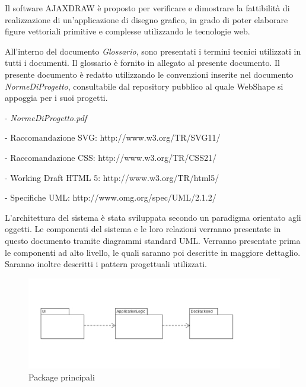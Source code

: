 Il software AJAXDRAW \`e proposto per verificare e dimostrare la fattibilit\`a di realizzazione di un'applicazione di disegno grafico, in grado di poter elaborare figure vettoriali primitive e complesse utilizzando le tecnologie web.

All'interno del documento \textit{Glossario}, sono presentati i termini tecnici utilizzati in tutti i documenti. Il glossario \`e fornito in allegato al presente documento.
Il presente documento \`e redatto utilizzando le convenzioni inserite nel documento \textit{NormeDiProgetto}, consultabile dal repository pubblico al quale WebShape si appoggia per i suoi progetti.
\begin{elencopuntato}[\subsubsecindent]
\item[-] \textit{NormeDiProgetto.pdf}
\item[-] Raccomandazione SVG: http://www.w3.org/TR/SVG11/
\item[-] Raccomandazione CSS: http://www.w3.org/TR/CSS21/
\item[-] Working Draft HTML 5: http://www.w3.org/TR/html5/
\item[-] Specifiche UML: http://www.omg.org/spec/UML/2.1.2/
\end{elencopuntato}

L'architettura del sistema \`e stata sviluppata secondo un paradigma orientato agli oggetti. Le componenti del sistema e le loro relazioni verranno presentate in questo documento tramite diagrammi standard UML. Verranno presentate prima le componenti ad alto livello, le quali saranno poi descritte in maggiore dettaglio. Saranno inoltre descritti i pattern progettuali utilizzati.

\begin{figure}[!ht]
\centering
\includegraphics{MainView.jpg}
\caption{Package principali}
\end{figure}

